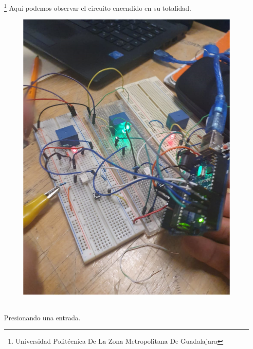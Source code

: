 \documentclass[10pt,a4paper]{article}
\begin{document}
\footnote{Universidad Politécnica De La Zona Metropolitana De Guadalajara}
\newpage
Aqui podemos observar el circuito encendido en su totalidad.
\begin{figure}[hbtp]
\centering
\includegraphics[scale=0.30]{002.png} 
\end{figure}\\
Presionando una entrada.
\end{document}
